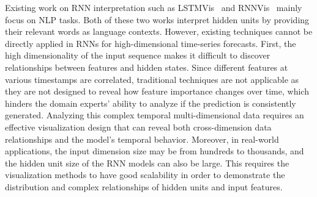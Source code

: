 


Existing work on RNN interpretation such as LSTMVis~\cite{strobelt2018lstmvis} and RNNVis~\cite{ming2017understanding} mainly focus on NLP tasks. 
Both of these two works interpret hidden units by providing their relevant words as language contexts.
However, existing techniques cannot be directly applied in RNNs for high-dimensional time-series forecasts.
First, the high dimensionality of the input sequence makes it difficult to discover relationships between features and hidden states. 
Since different features at various timestamps are correlated, traditional techniques are not applicable as they are not designed to reveal how feature importance changes over time, which hinders the domain experts' ability to analyze if the prediction is consistently generated.
Analyzing this complex temporal multi-dimensional data requires an effective visualization design that can reveal both cross-dimension data relationships and the model's temporal behavior.
Moreover, in real-world applications, the input dimension size may be from hundreds to thousands, and the hidden unit size of the RNN models can also be large.
This requires the visualization methods to have good scalability in order to demonstrate the distribution and complex relationships of hidden units and input features.

